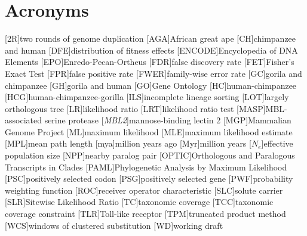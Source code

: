 \section*{Acronyms}
\label{Acronyms}
\begin{acronym}[TDMA]

[2R]{two rounds of genome duplication}
[AGA]{African great ape}
[CH]{chimpanzee and human}
[DFE]{distribution of fitness effects}
[ENCODE]{Encyclopedia of DNA Elements}
[EPO]{Enredo-Pecan-Ortheus}
[FDR]{false discovery rate}
[FET]{Fisher's Exact Test}
[FPR]{false positive rate}
[FWER]{family-wise error rate}
[GC]{gorila and chimpanzee}
[GH]{gorila and human}
[GO]{Gene Ontology}
[HC]{human-chimpanzee}
[HCG]{human-chimpanzee-gorilla}
[ILS]{incomplete lineage sorting}
[LOT]{largely orthologous tree}
[LR]{likelihood ratio}
[LRT]{likelihood ratio test}
[MASP]{MBL-associated serine protease}
[\emph{MBL2}]{mannose-binding lectin 2}
[MGP]{Mammalian Genome Project}
[ML]{maximum likelihood}
[MLE]{maximum likelihood estimate}
[MPL]{mean path length}
[mya]{million years ago}
[Myr]{million years}
[$N_{e}$]{effective population size}
[NPP]{nearby paralog pair}
[OPTIC]{Orthologous and Paralogous Transcripts in Clades}
[PAML]{Phylogenetic Analysis by Maximum Likelihood}
[PSC]{positively selected codon}
[PSG]{positively selected gene}
[PWF]{probability weighting function}
[ROC]{receiver operator characteristic}
[SLC]{solute carrier}
[SLR]{Sitewise Likelihood Ratio}
[TC]{taxonomic coverage}
[TCC]{taxonomic coverage constraint}
[TLR]{Toll-like receptor}
[TPM]{truncated product method}
[WCS]{windows of clustered substitution}
[WD]{working draft}

\end{acronym}
